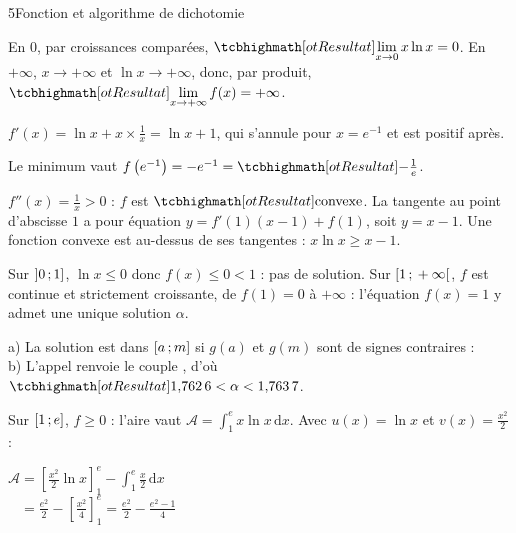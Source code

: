 \begin{corrigeBac}{5}{Fonction et algorithme de dichotomie}
\begin{questions}
  \item En $0$, par croissances comparées, $\res{\lim\limits_{x\to0}x\ln x=0}$. En $+\infty$, $x\to+\infty$ et $\ln x\to+\infty$, donc, par
    produit, $\res{\lim\limits_{x\to+\infty}f(x)=+\infty}$. 
  \item $f'(x)=\ln x+x\times\frac1x=\ln x+1$, qui s'annule pour $x=e^{-1}$ et est positif après.
\begin{center}
\begin{tableau}
\end{tableau}
\end{center}
    Le minimum vaut $f\left(e^{-1}\right)=-e^{-1}=\res{-\tfrac1e}$. \pts{1 pt}
  \item $f''(x)=\frac1x>0$ : $f$ est $\res{\text{convexe}}$. La tangente au point d'abscisse $1$ a pour équation $y=f'(1)(x-1)+f(1)$, soit
    $y=x-1$. Une fonction convexe est au-dessus de ses tangentes : $x\ln x\geq x-1$. 
\end{questions}
\begin{questions}[resume]
  \item Sur $\mathopen{]}0\,{;}\,1\mathclose{]}$, $\ln x\leq0$ donc $f(x)\leq0<1$ : pas de solution. Sur $\mathopen{[}1\,{;}\,+\infty\mathclose{[}$, $f$ est continue et strictement
    croissante, de $f(1)=0$ à $+\infty$ : l'équation $f(x)=1$ y admet une unique solution $\alpha$. \pts{1 pt}
  \item a) La solution est dans $\mathopen{[}a\,{;}\,m\mathclose{]}$ si $g(a)$ et $g(m)$ sont de signes contraires : \\
    b) L'appel renvoie le couple , d'où $\res{1{,}762\,6<\alpha<1{,}763\,7}$. 
  \item Sur $\mathopen{[}1\,{;}\,e\mathclose{]}$, $f\geq0$ : l'aire vaut $\mathcal{A}=\int_1^{e}x\ln x\,\mathrm{d}x$. Avec $u(x)=\ln x$ et $v(x)=\frac{x^{2}}{2}$ :
\begin{codecote}[0.56]
\raggedright
$\mathcal{A}=\left[\frac{x^{2}}{2}\ln x\right]_1^{e}-\int_1^{e}\frac x2\,\mathrm{d}x$\\[1mm]
$\phantom{\mathcal{A}}=\frac{e^{2}}{2}-\left[\frac{x^{2}}{4}\right]_1^{e}=\frac{e^{2}}{2}-\frac{e^{2}-1}{4}$\\[1mm]

\end{codecote}
\end{questions}
\end{corrigeBac}

